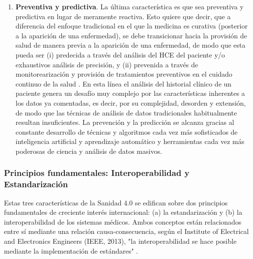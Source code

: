 \begin{enumerate}

\item \textbf{Preventiva y predictiva}. La última característica es que sea preventiva y predictiva en lugar de meramente reactiva. Esto quiere que decir, que a diferencia del enfoque tradicional en el que la medicina es curativa (posterior a la aparición de una enfermedad), se debe transicionar hacia la provisión de salud de manera previa a la aparición de una enfermedad, de modo que esta pueda ser (i) predecida a través del análisis del HCE del paciente y/o exhaustivos análisis de precisión, y (ii) prevenida a través de monitorearización y provisión de tratamientos preventivos en el cuidado continuo de la salud \cite{ruiz2023inteligencia}. En esta línea el análisis del historial clínico de un paciente genera un desafío muy complejo por las características inherentes a los datos ya comentadas, es decir, por su complejidad, desorden y extensión, de modo que las técnicas de análisis de datos tradicionales habitualmente resultan insuficientes. La prevención y la predicción se alcanza gracias al constante desarrollo de técnicas y algoritmos cada vez más sofisticados de inteligencia artificial y aprendizaje automático y herramientas cada vez más poderosas de ciencia y análisis de datos masivos.
\end{enumerate}

\subsubsection{Principios fundamentales: Interoperabilidad y Estandarización}

Estas tres características de la Sanidad 4.0 se edifican sobre dos principios fundamentales de creciente interés internacional: (a) la estandarización y (b) la interoperabilidad de los sistemas médicos. Ambos conceptos están relacionados entre sí mediante una relación causa-consecuencia, según el Institute of Electrical and Electronics Engineers (IEEE, 2013), "la interoperabilidad se hace posible mediante la implementación de estándares" \cite{berryman2013data}.

